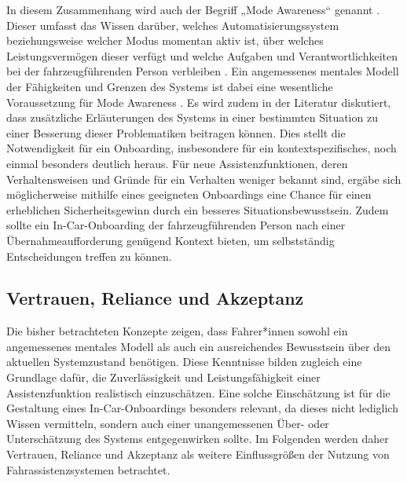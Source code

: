 In diesem Zusammenhang wird auch der Begriff „Mode Awareness“ genannt \cite{kurpiers2020mode}. Dieser umfasst das Wissen darüber, welches Automatisierungssystem beziehungsweise welcher Modus momentan aktiv ist, über welches Leistungsvermögen dieser verfügt und welche Aufgaben und Verantwortlichkeiten bei der fahrzeugführenden Person verbleiben \cite{kurpiers2020mode}. Ein angemessenes mentales Modell der Fähigkeiten und Grenzen des Systems ist dabei eine wesentliche Voraussetzung für Mode Awareness \cite{kurpiers2020mode}. Es wird zudem in der Literatur \cite{Geisler_hci2021} diskutiert, dass zusätzliche Erläuterungen des Systems in einer bestimmten Situation zu einer Besserung dieser Problematiken beitragen können. Dies stellt die Notwendigkeit für ein Onboarding, insbesondere für ein kontextspezifisches, noch einmal besonders deutlich heraus. Für neue Assistenzfunktionen, deren Verhaltensweisen und Gründe für ein Verhalten weniger bekannt sind, ergäbe  sich möglicherweise mithilfe eines geeigneten Onboardings eine Chance für einen erheblichen Sicherheitsgewinn durch ein besseres Situationsbewusstsein. Zudem sollte ein In-Car-Onboarding der fahrzeugführenden Person nach einer Übernahmeaufforderung genügend Kontext bieten, um selbstständig Entscheidungen treffen zu können. 

\subsection{Vertrauen, Reliance und Akzeptanz}
\label{subsec:vertrauen_akzeptanz}
Die bisher betrachteten Konzepte zeigen, dass Fahrer*innen sowohl ein angemessenes mentales Modell als auch ein ausreichendes Bewusstsein über den aktuellen Systemzustand benötigen. Diese Kenntnisse bilden zugleich eine Grundlage dafür, die Zuverlässigkeit und Leistungsfähigkeit einer Assistenzfunktion realistisch einzuschätzen. Eine solche Einschätzung ist für die Gestaltung eines In-Car-Onboardings besonders relevant, da dieses nicht lediglich Wissen vermitteln, sondern auch einer unangemessenen Über- oder Unterschätzung des Systems entgegenwirken sollte. Im Folgenden werden daher Vertrauen, Reliance und Akzeptanz als weitere Einflussgrößen der Nutzung von Fahrassistenzsystemen betrachtet.

